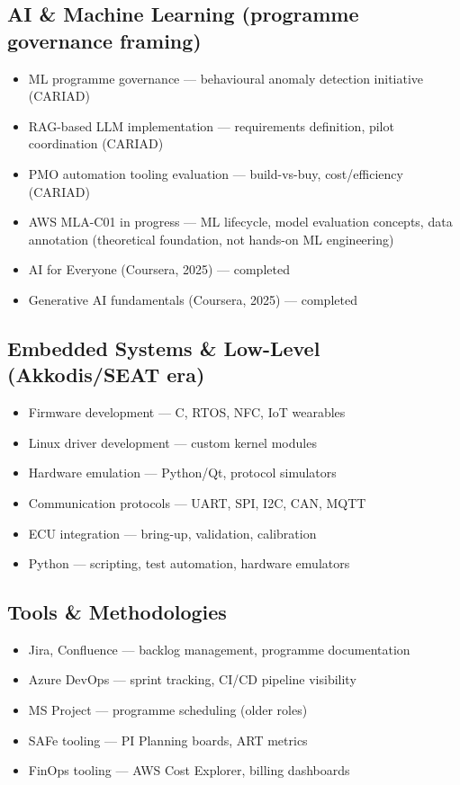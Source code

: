 \documentclass[10pt,a4paper]{article}
\begin{document}
\subsection*{AI \& Machine Learning (programme governance framing)}
\begin{itemize}
  \item ML programme governance — behavioural anomaly detection initiative (CARIAD)
  \item RAG-based LLM implementation — requirements definition, pilot coordination (CARIAD)
  \item PMO automation tooling evaluation — build-vs-buy, cost/efficiency (CARIAD)
  \item AWS MLA-C01 in progress — ML lifecycle, model evaluation concepts, data annotation
        (theoretical foundation, not hands-on ML engineering)
  \item AI for Everyone (Coursera, 2025) — completed
  \item Generative AI fundamentals (Coursera, 2025) — completed
\end{itemize}

\subsection*{Embedded Systems \& Low-Level (Akkodis/SEAT era)}
\begin{itemize}
  \item Firmware development — C, RTOS, NFC, IoT wearables
  \item Linux driver development — custom kernel modules
  \item Hardware emulation — Python/Qt, protocol simulators
  \item Communication protocols — UART, SPI, I2C, CAN, MQTT
  \item ECU integration — bring-up, validation, calibration
  \item Python — scripting, test automation, hardware emulators
\end{itemize}

\subsection*{Tools \& Methodologies}
\begin{itemize}
  \item Jira, Confluence — backlog management, programme documentation
  \item Azure DevOps — sprint tracking, CI/CD pipeline visibility
  \item MS Project — programme scheduling (older roles)
  \item SAFe tooling — PI Planning boards, ART metrics
  \item FinOps tooling — AWS Cost Explorer, billing dashboards
\end{itemize}
\end{document}
